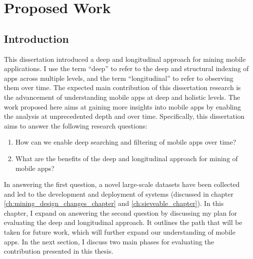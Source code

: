\chapter{Proposed Work}

\section{Introduction}
\label{ch:propsal}
This dissertation introduced a deep and longitudinal approach for mining mobile applications.
I use the term ``deep'' to refer to the deep and structural indexing of apps across multiple levels, and the term ``longitudinal'' to refer to observing them over time.
The expected main contribution of this dissertation research is the advancement of understanding mobile apps at deep and holistic levels.
The work proposed here aims at gaining more insights into mobile apps by enabling the analysis at unprecedented depth and over time.
Specifically, this dissertation aims to answer the following research questions:
\begin{enumerate}
	\item How can we enable deep searching and filtering of mobile apps over time?
	\item What are the benefits of the deep and longitudinal approach for mining of mobile apps?
\end{enumerate}

In answering the first question, a novel large-scale datasets have been collected and led to the development and deployment of systems (discussed in chapter \ref{ch:mining_design_changes_chapter} and \ref{ch:sieveable_chapter}).
In this chapter, I expand on answering the second question by discussing my plan for evaluating the deep and longitudinal approach.
It outlines the path that will be taken for future work, which will further expand our understanding of mobile apps.
In the next section, I discuss two main phases for evaluating the contribution presented in this thesis.



